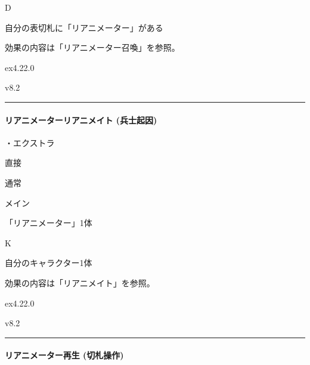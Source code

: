 \documentclass[letterpaper,10pt,dvipdfmx]{sphinxmanual}
\begin{document}
\sphinxAtStartPar
{} D

\sphinxAtStartPar
{}

\sphinxAtStartPar
自分の表切札に「リアニメーター」がある

\sphinxAtStartPar
{}

\sphinxAtStartPar
効果の内容は「リアニメーター召喚」を参照。

\sphinxAtStartPar
{}  ex4.22.0

\sphinxAtStartPar
{}  v8.2


\bigskip\hrule\bigskip



\paragraph{リアニメーターリアニメイト (兵士起因)}
\label{\detokenize{auto/frameActionlist:id28}}\label{\detokenize{auto/frameActionlist:id29}}
\sphinxAtStartPar
{}

\sphinxAtStartPar
・エクストラ

\sphinxAtStartPar
{} 直接

\sphinxAtStartPar
{} 通常

\sphinxAtStartPar
{} メイン

\sphinxAtStartPar
{} 「リアニメーター」1体

\sphinxAtStartPar
{} K

\sphinxAtStartPar
{}

\sphinxAtStartPar
自分のキャラクター1体

\sphinxAtStartPar
{}

\sphinxAtStartPar
効果の内容は「リアニメイト」を参照。

\sphinxAtStartPar
{}  ex4.22.0

\sphinxAtStartPar
{}  v8.2


\bigskip\hrule\bigskip



\paragraph{リアニメーター再生 (切札操作)}
\label{\detokenize{auto/frameActionlist:act-reanimatorrevive}}\label{\detokenize{auto/frameActionlist:id30}}
\sphinxAtStartPar
{}
\end{document}
